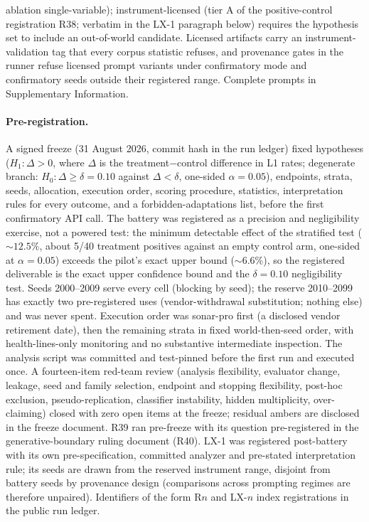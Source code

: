 \documentclass[11pt]{article}
\begin{document}
ablation single-variable); instrument-licensed (tier A of the positive-control registration R38; verbatim in the LX-1 paragraph below) requires the hypothesis set to include an out-of-world candidate. Licensed artifacts carry an instrument-validation tag that every corpus statistic refuses, and provenance gates in the runner refuse licensed prompt variants under confirmatory mode and confirmatory seeds outside their registered range. Complete prompts in Supplementary Information.

\paragraph{Pre-registration.} A signed freeze (31 August 2026, commit hash in the run ledger) fixed hypotheses ($H_1\!: \Delta > 0$, where $\Delta$ is the treatment$-$control difference in L1 rates; degenerate branch: $H_0\!: \Delta \geq \delta = 0.10$ against $\Delta < \delta$, one-sided $\alpha = 0.05$), endpoints, strata, seeds, allocation, execution order, scoring procedure, statistics, interpretation rules for every outcome, and a forbidden-adaptations list, before the first confirmatory API call. The battery was registered as a precision and negligibility exercise, not a powered test: the minimum detectable effect of the stratified test (${\sim}12.5\%$, about 5/40 treatment positives against an empty control arm, one-sided at $\alpha = 0.05$) exceeds the pilot's exact upper bound (${\sim}6.6\%$), so the registered deliverable is the exact upper confidence bound and the $\delta = 0.10$ negligibility test. Seeds 2000--2009 serve every cell (blocking by seed); the reserve 2010--2099 has exactly two pre-registered uses (vendor-withdrawal substitution; nothing else) and was never spent. Execution order was sonar-pro first (a disclosed vendor retirement date), then the remaining strata in fixed world-then-seed order, with health-lines-only monitoring and no substantive intermediate inspection. The analysis script was committed and test-pinned before the first run and executed once. A fourteen-item red-team review (analysis flexibility, evaluator change, leakage, seed and family selection, endpoint and stopping flexibility, post-hoc exclusion, pseudo-replication, classifier instability, hidden multiplicity, over-claiming) closed with zero open items at the freeze; residual ambers are disclosed in the freeze document. R39 ran pre-freeze with its question pre-registered in the generative-boundary ruling document (R40). LX-1 was registered post-battery with its own pre-specification, committed analyzer and pre-stated interpretation rule; its seeds are drawn from the reserved instrument range, disjoint from battery seeds by provenance design (comparisons across prompting regimes are therefore unpaired). Identifiers of the form R$n$ and LX-$n$ index registrations in the public run ledger.
\end{document}
